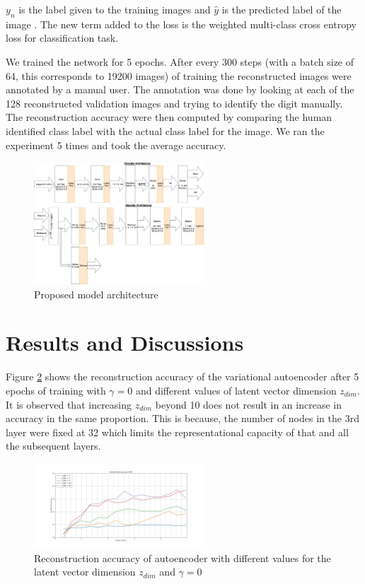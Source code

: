 \documentclass[journal]{IEEEtran}
\begin{document}
$y_n$ is the label given to the training images and $\hat{y}$ is the predicted label of the image . The new term added to the loss is the weighted multi-class cross entropy loss for classification task. 

We trained the network for 5 epochs. After every 300 steps (with a batch size of 64, this corresponds to 19200 images) of training the reconstructed images were annotated by a manual user. The annotation was done by looking at each of the 128  reconstructed validation images and trying to identify the digit manually. The reconstruction accuracy were then computed by comparing the human identified class label with the actual class label for the image. We ran the experiment 5 times and took the average accuracy.


\begin{figure}[!t]
\centering
\includegraphics[width=2.5in]{vae_model_architecture_classification.jpg}
\caption{Proposed model architecture}
\label{vae_architecture}
\end{figure}


\section{Results and Discussions}
Figure \ref{reconstruction_accuracy} shows  the reconstruction accuracy of the variational autoencoder after 5 epochs of training with $\gamma = 0$  and different values of latent vector dimension $z_{dim}$. It is observed that increasing $z_{dim}$ beyond 10 does not result in an increase in accuracy in the same proportion. This is because, the number of nodes in the 3rd layer were fixed at 32 which limits the representational capacity of that and all the subsequent layers.


\begin{figure}[!t]
\centering
\includegraphics[width=2.5in]{reconstruction_accuracy.jpg}
\caption{Reconstruction accuracy of autoencoder with different values for the latent vector dimension  $z_{dim}$ and $\gamma = 0$}
\label{reconstruction_accuracy}
\end{figure}
\end{document}
